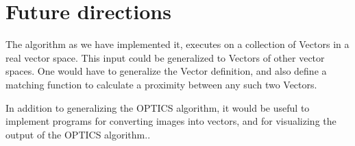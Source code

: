 \documentclass[12pt,a4paper]{article}
\begin{document}
\section{Future directions}
The algorithm as we have implemented it, executes on a collection of Vectors in a real vector space. This input could be generalized to Vectors of other vector spaces. One would have to generalize the Vector definition, and also define a matching function to calculate a proximity between any such two Vectors.

In addition to generalizing the OPTICS algorithm, it would be useful to implement programs for converting images into vectors, and for visualizing the output of the OPTICS algorithm..
\end{document}
